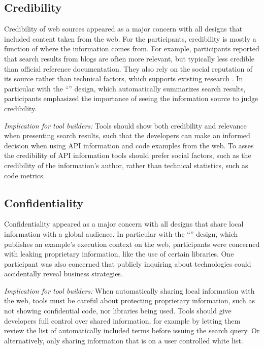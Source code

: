\moarsauce
\subsection{Credibility}

Credibility of web sources appeared as a major concern with all designs that included content taken from the web. For the participants, credibility is mostly a function of where the information comes from. For example, participants reported that search results from blogs are often more relevant, but typically less credible than official reference documentation. They also rely on the social reputation of its source rather than technical factors, which supports existing research \cite{Gysin2010a}. In particular with the ``\FacettedSearch'' design, which automatically summarizes search results, participants emphasized the importance of seeing the information source to judge credibility.  

\emph{Implication for tool builders:} Tools should show both credibility and relevance when presenting search results, such that the developers can make an informed decision when using API information and code examples from the web. To asses the credibility of API information tools should prefer social factors, such as the credibility of the information's author, rather than technical statistics, such as code metrics.

\moarsauce
\subsection{Confidentiality}

Confidentiality appeared as a major concern with all designs that share local information with a global audience. In particular with the ``\CloudREPL'' design, which publishes an example's execution context on the web, participants were concerned with leaking proprietary information, like the use of certain libraries. One participant was also concerned that publicly inquiring about technologies could accidentally reveal business strategies.

\emph{Implication for tool builders:} When automatically sharing local information with the web, tools must be careful about protecting proprietary information, such as not showing confidential code, nor libraries being used. Tools should give developers full control over shared information, for example by letting them review the list of automatically included terms before issuing the search query. Or alternatively, only sharing information that is on a user controlled white list.

